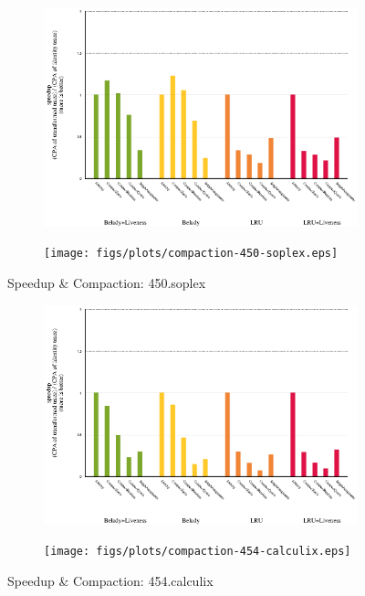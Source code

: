 \begin{figure}[!ht]
  \begin{subfigure}[b]{0.5\textwidth}%
    \includegraphics[width=\textwidth]{figs/plots/speedup-450-soplex.eps}
  \end{subfigure}%
  \begin{subfigure}[b]{0.5\textwidth}%
    \texttt{[image: figs/plots/compaction-450-soplex.eps]}
  \end{subfigure}%
    \caption{Speedup \& Compaction: 450.soplex}
  \label{fig:speedup-compaction-450-soplex}
\end{figure}

\begin{figure}[!ht]
  \begin{subfigure}[b]{0.5\textwidth}%
    \includegraphics[width=\textwidth]{figs/plots/speedup-454-calculix.eps}
  \end{subfigure}%
  \begin{subfigure}[b]{0.5\textwidth}%
    \texttt{[image: figs/plots/compaction-454-calculix.eps]}
  \end{subfigure}%
    \caption{Speedup \& Compaction: 454.calculix}
  \label{fig:speedup-compaction-454-calculix}
\end{figure}

